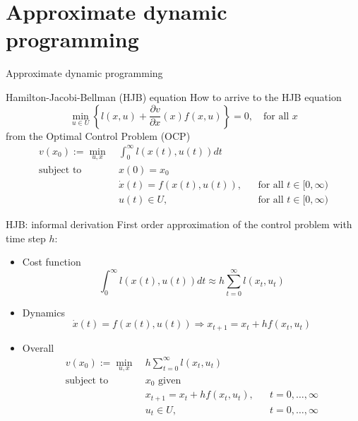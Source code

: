 \documentclass[aspectratio=169]{beamer}
\begin{document}
\section{Approximate dynamic programming}
\begin{frame}
\huge
\centering
{\color{darkred} Approximate dynamic programming}
\end{frame}

\begin{frame}{Hamilton-Jacobi-Bellman (HJB) equation}
How to arrive to the HJB equation
$$
\min_{u \in U} \left\{ l(x, u) + \frac{\partial v}{\partial x} (x) f(x, u) \right\} = 0, \quad \text{for all } x
$$
from the Optimal Control Problem (OCP)
\begin{align*}
v(x_0) := \min_{u, x} \ &\int_0^\infty l(x(t), u(t)) dt \\
\text{subject to} \ & x(0) = x_0 \\
& \dot x(t) = f(x(t), u(t)), &&  \text{for all }t \in [0, \infty) \\
& u(t) \in U, &&  \text{for all }t \in [0, \infty)
\end{align*}
\end{frame}

\begin{frame}{HJB: informal derivation}
First order approximation of the control problem with time step $h$:
\begin{itemize}
\item
Cost function
$$
\int_0^\infty l(x(t), u(t)) dt
\approx
h \sum_{t=0}^\infty l(x_t, u_t)
$$
\item
Dynamics
$$
\dot x(t) = f(x(t), u(t))
\Rightarrow
x_{t+1} = x_t + h f(x_t, u_t)
$$
\item
Overall
\begin{align*}
v(x_0) := \min_{u, x} \ &h \sum_{t=0}^\infty l(x_t, u_t) \\
\text{subject to} \ & x_0 \text{ given} \\
& x_{t+1} = x_t + h f(x_t, u_t), &&  t = 0, \ldots, \infty \\
& u_t \in U, &&  t = 0, \ldots, \infty
\end{align*}
\end{itemize}
\end{frame}
\end{document}
